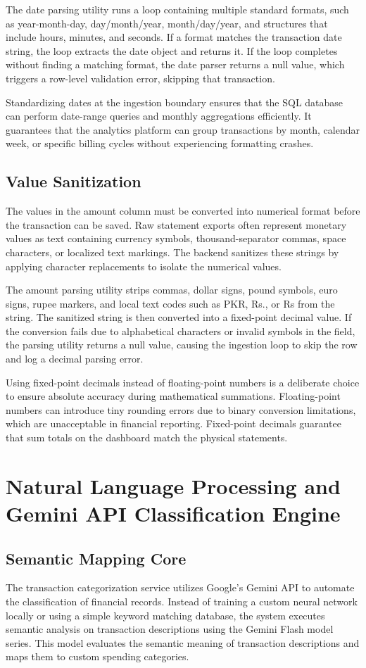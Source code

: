 The date parsing utility runs a loop containing multiple standard formats, such as year-month-day, day/month/year, month/day/year, and structures that include hours, minutes, and seconds. If a format matches the transaction date string, the loop extracts the date object and returns it. If the loop completes without finding a matching format, the date parser returns a null value, which triggers a row-level validation error, skipping that transaction.

Standardizing dates at the ingestion boundary ensures that the SQL database can perform date-range queries and monthly aggregations efficiently. It guarantees that the analytics platform can group transactions by month, calendar week, or specific billing cycles without experiencing formatting crashes.

\subsection{Value Sanitization}
The values in the amount column must be converted into numerical format before the transaction can be saved. Raw statement exports often represent monetary values as text containing currency symbols, thousand-separator commas, space characters, or localized text markings. The backend sanitizes these strings by applying character replacements to isolate the numerical values.

The amount parsing utility strips commas, dollar signs, pound symbols, euro signs, rupee markers, and local text codes such as PKR, Rs., or Rs from the string. The sanitized string is then converted into a fixed-point decimal value. If the conversion fails due to alphabetical characters or invalid symbols in the field, the parsing utility returns a null value, causing the ingestion loop to skip the row and log a decimal parsing error.

Using fixed-point decimals instead of floating-point numbers is a deliberate choice to ensure absolute accuracy during mathematical summations. Floating-point numbers can introduce tiny rounding errors due to binary conversion limitations, which are unacceptable in financial reporting. Fixed-point decimals guarantee that sum totals on the dashboard match the physical statements.

\section{Natural Language Processing and Gemini API Classification Engine}
\subsection{Semantic Mapping Core}
The transaction categorization service utilizes Google's Gemini API to automate the classification of financial records. Instead of training a custom neural network locally or using a simple keyword matching database, the system executes semantic analysis on transaction descriptions using the Gemini Flash model series. This model evaluates the semantic meaning of transaction descriptions and maps them to custom spending categories.

